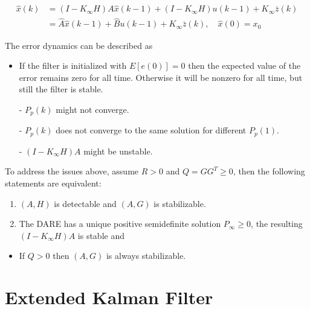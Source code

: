 \documentclass[10pt,a4paper]{scrartcl}
\begin{document}
\begin{multicols*}{2}


\begin{align*}
\hat{x}(k)&=(I-K_\infty H)A\hat{x}(k-1)+(I-K_\infty H)u(k-1)+K_\infty \bar{z}(k)\\
&=\hat{A}\hat{x}(k-1)+\hat{B}u(k-1)+K_\infty\bar{z}(k),\quad \hat{x}(0)=x_0
\end{align*}

The error dynamics can be described as



\begin{itemize}
\item If the filter is initialized with $E[e(0)]=0$ then the expected value of the error remains zero for all time. Otherwise it will be nonzero for all time, but still the filter is stable.
\item[-] $P_p(k)$ might not converge.
\item[-] $P_p(k)$ does not converge to the same solution for different $P_p(1)$.
\item[-] $(I-K_\infty H)A$ might be unstable.
\end{itemize}

To address the issues above, assume $R>0$ and $Q = GG^T\geq 0$, then the following statements are equivalent:

\begin{enumerate}
\item $(A,H)$ is detectable and $(A,G)$ is stabilizable.
\item The DARE has a unique positive semidefinite solution $P_\infty\geq 0$, the resulting $(I-K_\infty H)A$ is stable and

\end{enumerate}

\begin{itemize}
\item If $Q>0$ then $(A,G)$ is always stabilizable.
\end{itemize}

\section{Extended Kalman Filter}
\label{sec:EKF}


\end{multicols*}
\end{document}

